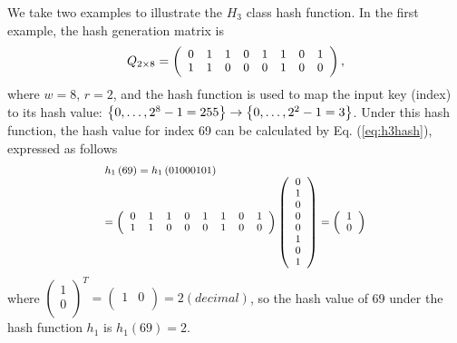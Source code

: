 \documentclass[10pt,journal,compsoc]{IEEEtran}
\begin{document}
We take two examples to illustrate the $H_3$ class hash function. In the first example, the hash generation matrix is
\begin{equation}
\footnotesize
{Q_{2 \times 8}} = \left( {\begin{array}{*{20}{c}}
   0 & 1 & 1 & 0 & 1 & 1 & 0 & 1  \\
   1 & 1 & 0 & 0 & 0 & 1 & 0 & 0  \\
\end{array}} \right),
\label{eq:h1matrix}
\end{equation}
where $w=8$, $r=2$, and the hash function is used to map the input key (index) to its hash value: $\left\{ {0, \ldots ,{{\rm{2}}^{\rm{8}}} - {\rm{1}} = {\rm{255}}} \right\} \to \left\{ {0, \ldots ,{{\rm{2}}^{\rm{2}}} - {\rm{1}} = {\rm{3}}} \right\}$. Under this hash function, the hash value for index 69 can be calculated by Eq. (\ref{eq:h3hash}), expressed as follows
\begin{equation}
\scriptsize
\begin{array}{l}
 h_1\left( {69} \right) = h_1\left( {{\rm{01000101}}} \right) \\
  = \left( {\begin{array}{*{20}{c}}
   0 & 1 & 1 & 0 & 1 & 1 & 0 & 1  \\
   1 & 1 & 0 & 0 & 0 & 1 & 0 & 0  \\
\end{array}} \right)\left( {\begin{array}{*{20}{c}}
   0  \\
   1  \\
   0  \\
   0  \\
   0  \\
   1  \\
   0  \\
   1  \\
\end{array}} \right) = \left( {\begin{array}{*{20}{c}}
   1  \\
   0  \\
\end{array}} \right) \\
 \end{array}
\label{eq:h3example1}
\end{equation}
where ${\left( {\begin{array}{*{20}{c}}
   1  \\
   0  \\
\end{array}} \right)^T} = \left( {\begin{array}{*{20}{c}}
   1 & 0  \\
\end{array}} \right) = 2\left( {decimal} \right)$, so the hash value of 69 under the hash function $h_1$ is $h_1(69)=2$.
\end{document}
